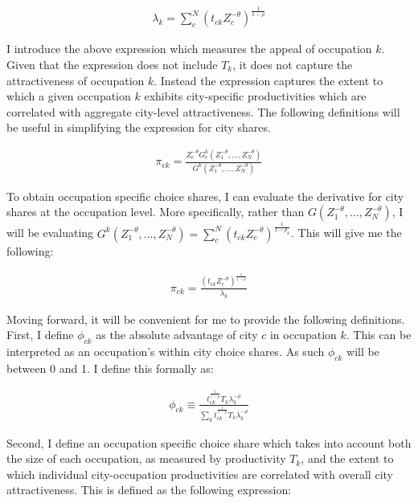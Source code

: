 \documentclass[10pt]{article}
\begin{document}
\begin{align*}
    \lambda_{k} = \sum_{c}^{N} \left( t_{ck} Z_{c}^{-\theta} \right)^{\frac{1}{1-\rho}}
\end{align*}

I introduce the above expression which measures the appeal of occupation $k$. Given that the expression does not include $T_k$, it does not capture the attractiveness of occupation $k$. Instead the expression captures the extent to which a given occupation $k$ exhibits city-specific productivities which are correlated with aggregate city-level attractiveness. The following definitions will be useful in simplifying the expression for city shares.

\begin{align*}
    \pi_{ck} = \frac{Z_c^{- \theta} G_c^k(Z_1^{- \theta}, \dots, Z_N^{- \theta})}{G^k(Z_1^{- \theta}, \dots, Z_N^{- \theta})}
\end{align*}

To obtain occupation specific choice shares, I can evaluate the derivative for city shares at the occupation level. More specifically, rather than $G(Z_1^{- \theta}, \dots, Z_N^{- \theta})$, I will be evaluating $G^k(Z_1^{- \theta}, \dots, Z_N^{- \theta}) = \sum_{c}^{N} (t_{ck} Z_c^{- \theta})^{\frac{1}{1 - \rho_k}}$. This will give me the following:

\begin{align}
    \pi_{ck} = \frac{(t_{ck} Z_c^{-\theta})^{\frac{1}{1 - \rho}}}{\lambda_k}
    \label{city_occuaption_shares}
\end{align}

Moving forward, it will be convenient for me to provide the following definitions. First, I define $\phi_{ck}$ as the absolute advantage of city $c$ in occupation $k$. This can be interpreted as an occupation's within city choice shares. As such $\phi_{ck}$ will be between 0 and 1. I define this formally as:

\begin{align}
    \phi_{ck} \equiv \frac{{t^{\frac{1}{1-\rho}}_{ck}}{T_{k}}\lambda_{k}^{-\rho}}{\sum\limits_{k}{t^{\frac{1}{1-\rho}}_{ck}}{T_{k}}\lambda_{k}^{-\rho}}
    \label{occupation_by_city_shares}
\end{align}

Second, I define an occupation specific choice share which takes into account both the size of each occupation, as measured by productivity $T_k$, and the extent to which individual city-occupation productivities are correlated with overall city attractiveness. This is defined as the following expression:
\end{document}
